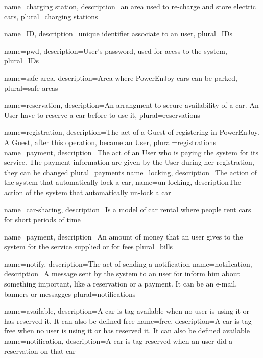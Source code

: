 {
  name={charging station},
  description={an area used to re-charge and store electric cars},
  plural={charging stations}
}

{
  name={ID},
  description={unique identifier associate to an user},
  plural={IDs}
}

{
  name={pwd},
  description={User's password, used for acess to the system},
  plural={IDs}
}

{
  name={safe area},
  description={Area where PowerEnJoy cars can be parked},
  plural={safe areas}
}

{
  name={reservation},
  description={An arrangment to secure availability of a car. An User have to reserve a car before to use it},
  plural={reservations}
}


{
	name={registration},
	description={The act of a Guest of registering in PowerEnJoy. A Guest, after this operation, became an User},
	plural={registrations}
}
{
	name={payment},
	description={The act of an User who is paying the system for its service. The payment information are given by the User during her \gls{registration}, they can be changed}
	plural={payments}
}
{
	name={locking},
	description={The action of the system that automatically lock a car},
}
{
	name={un-locking},
	description{The action of the system that automatically un-lock a car}
}

{
	name={car-sharing},
	description={Is a model of car rental where people rent cars for short periods of time}
}

{
	name={payment},
	description={An amount of money that an user gives to the system for the service supplied or for fees}
	plural={bills}
}

{
	name={notify},
	description={The act of sending a notification}
}
{
	name={notification},
	description={A message sent by the system to an user for inform him about something important, like a reservation or a payment. It can be an e-mail, banners or messagges}
	plural={notifications}
}

{
	name={available},
	description={A car is tag available when no user is using it or has reserved it. It can also be defined free}
}
{
	name={free},
	description={A car is tag free when no user is using it or has reserved it. It can also be defined available}
}
{
	name={notification},
	description={A car is tag reserved when an user did a reservation on that car}
}

